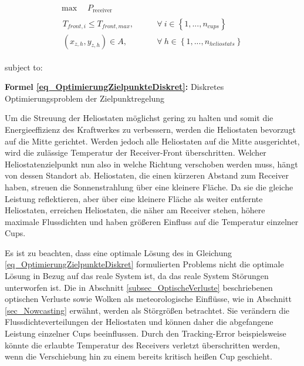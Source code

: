 \begin{equation} \label{eq_OptimierungZielpunkteDiskret}
\begin{gathered}
    \max \quad P_{\text {receiver }}  \qquad \\
    \begin{aligned}
        T_{front,i} \leq T_{front,max}, \qquad      & \forall~i \in \left\{1, ..., n_{cups} \right\}       \\
        \left(x_{z,h}, y_{z,h}\right) \in A, \qquad & \forall~h \in \left\{1, ..., n_{heliostats} \right\}
    \end{aligned}
\end{gathered}
\end{equation}

\enlargethispage*{2\baselineskip}
\vspace*{-2.95\baselineskip}
\qquad subject to:
\vspace*{1.95\baselineskip}
\centerline{\small{\textsf{\textbf{Formel \ref{eq_OptimierungZielpunkteDiskret}:}} Diskretes Optimierungsproblem der Zielpunktregelung}}

Um die Streuung der Heliostaten möglichst gering zu halten und somit die Energieeffizienz des Kraftwerkes zu verbessern, werden die Heliostaten bevorzugt auf die Mitte gerichtet.
Werden jedoch alle Heliostaten auf die Mitte ausgerichtet, wird die zulässige Temperatur der Receiver-Front überschritten.
Welcher Heliostatenzielpunkt nun also in welche Richtung verschoben werden muss, hängt von dessen Standort ab.
Heliostaten, die einen kürzeren Abstand zum Receiver haben, streuen die Sonnenstrahlung über eine kleinere Fläche.
Da sie die gleiche Leistung reflektieren, aber über eine kleinere Fläche als weiter entfernte Heliostaten, erreichen Heliostaten, die näher am Receiver stehen, höhere maximale Flussdichten und haben größeren Einfluss auf die Temperatur einzelner Cups.

Es ist zu beachten, dass eine optimale Lösung des in Gleichung \ref{eq_OptimierungZielpunkteDiskret} formulierten Problems nicht die optimale Lösung in Bezug auf das reale System ist, da das reale System Störungen unterworfen ist.
Die in Abschnitt \ref{subsec_OptischeVerluste} beschriebenen optischen Verluste sowie Wolken als meteorologische Einflüsse, wie in Abschnitt \ref{sec_Nowcasting} erwähnt, werden als Störgrößen betrachtet.
Sie verändern die Flussdichteverteilungen der Heliostaten und können daher die abgefangene Leistung einzelner Cups beeinflussen.
Durch den Tracking-Error beispielsweise könnte die erlaubte Temperatur des Receivers verletzt überschritten werden, wenn die Verschiebung hin zu einem bereits kritisch heißen Cup geschieht. \cite[S. 16]{DissZanger}

